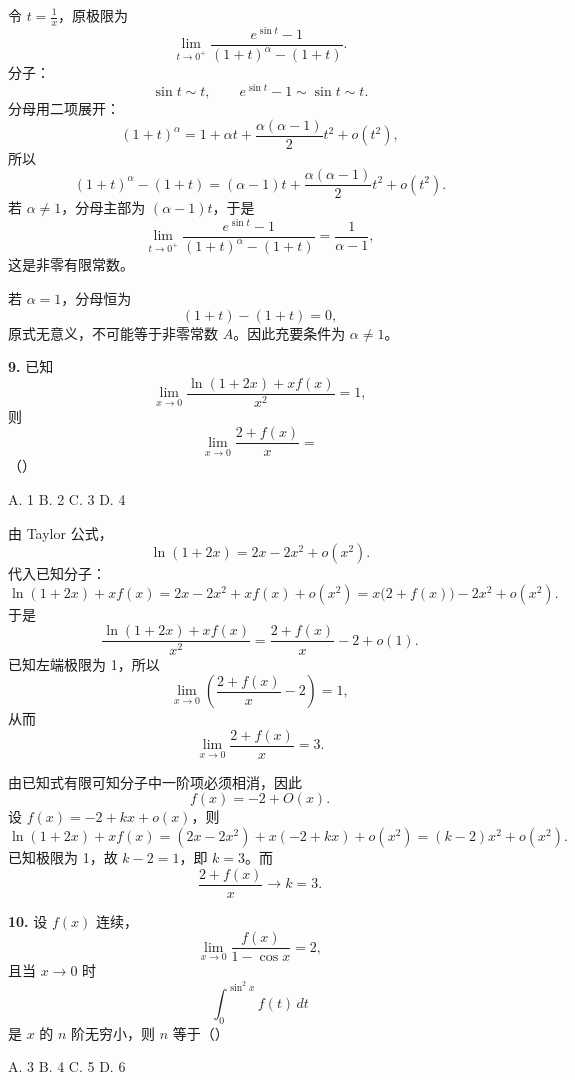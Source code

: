 \begin{solutionblock}

令 \(t=\frac1x\)，原极限为
\[
\lim_{t\to0^+}
\frac{e^{\sin t}-1}{(1+t)^\alpha-(1+t)}.
\]
分子：
\[
\sin t\sim t,\qquad e^{\sin t}-1\sim \sin t\sim t.
\]
分母用二项展开：
\[
(1+t)^\alpha=1+\alpha t+\frac{\alpha(\alpha-1)}2t^2+o(t^2),
\]
所以
\[
(1+t)^\alpha-(1+t)
=(\alpha-1)t+\frac{\alpha(\alpha-1)}2t^2+o(t^2).
\]
若 \(\alpha\ne1\)，分母主部为 \((\alpha-1)t\)，于是
\[
\lim_{t\to0^+}
\frac{e^{\sin t}-1}{(1+t)^\alpha-(1+t)}
=\frac{1}{\alpha-1},
\]
这是非零有限常数。

若 \(\alpha=1\)，分母恒为
\[
(1+t)-(1+t)=0,
\]
原式无意义，不可能等于非零常数 \(A\)。因此充要条件为 \(\alpha\ne1\)。

\end{solutionblock}

\begin{problemblock}
\textbf{9.} 已知
\[
\lim_{x\to0}\frac{\ln(1+2x)+xf(x)}{x^2}=1,
\]
则
\[
\lim_{x\to0}\frac{2+f(x)}{x}=
\]
（\quad）

A. 1 \qquad B. 2 \qquad C. 3 \qquad D. 4
\end{problemblock}

\begin{solutionblock}

由 Taylor 公式，
\[
\ln(1+2x)=2x-2x^2+o(x^2).
\]
代入已知分子：
\[
\ln(1+2x)+xf(x)
=2x-2x^2+xf(x)+o(x^2)
=x\bigl(2+f(x)\bigr)-2x^2+o(x^2).
\]
于是
\[
\frac{\ln(1+2x)+xf(x)}{x^2}
=\frac{2+f(x)}x-2+o(1).
\]
已知左端极限为 1，所以
\[
\lim_{x\to0}\left(\frac{2+f(x)}x-2\right)=1,
\]
从而
\[
\lim_{x\to0}\frac{2+f(x)}x=3.
\]

由已知式有限可知分子中一阶项必须相消，因此
\[
f(x)=-2+O(x).
\]
设 \(f(x)=-2+kx+o(x)\)，则
\[
\ln(1+2x)+xf(x)
=(2x-2x^2)+x(-2+kx)+o(x^2)
=(k-2)x^2+o(x^2).
\]
已知极限为 1，故 \(k-2=1\)，即 \(k=3\)。而
\[
\frac{2+f(x)}x\to k=3.
\]

\end{solutionblock}

\begin{problemblock}
\textbf{10.} 设 \(f(x)\) 连续，
\[
\lim_{x\to0}\frac{f(x)}{1-\cos x}=2,
\]
且当 \(x\to0\) 时
\[
\int_0^{\sin^2x} f(t)\,dt
\]
是 \(x\) 的 \(n\) 阶无穷小，则 \(n\) 等于（\quad）

A. 3 \qquad B. 4 \qquad C. 5 \qquad D. 6
\end{problemblock}

